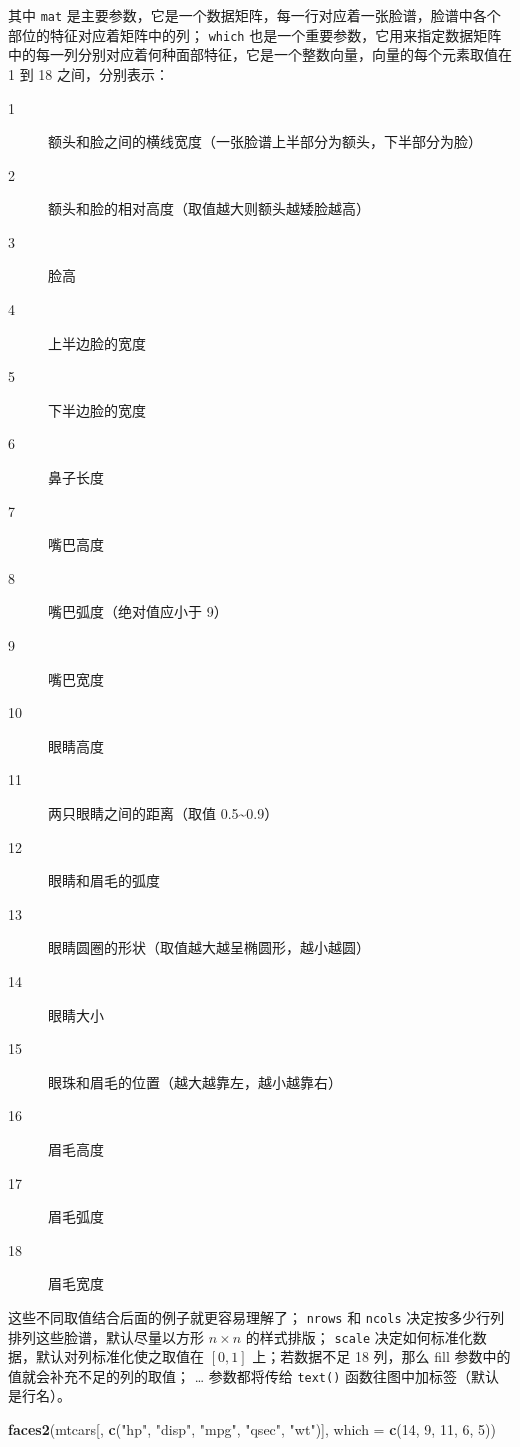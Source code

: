 \documentclass[
  b5paper,
  UTF8,twoside]{book}
\newenvironment{Shaded}{\begin{snugshade}}{\end{snugshade}}
\newcommand{\AttributeTok}[1]{\textcolor[rgb]{0.13,0.29,0.53}{#1}}
\newcommand{\DecValTok}[1]{\textcolor[rgb]{0.00,0.00,0.81}{#1}}
\newcommand{\FunctionTok}[1]{\textcolor[rgb]{0.13,0.29,0.53}{\textbf{#1}}}
\newcommand{\NormalTok}[1]{#1}
\newcommand{\StringTok}[1]{\textcolor[rgb]{0.31,0.60,0.02}{#1}}
\begin{document}
其中 \texttt{mat} 是主要参数，它是一个数据矩阵，每一行对应着一张脸谱，脸谱中各个部位的特征对应着矩阵中的列； \texttt{which} 也是一个重要参数，它用来指定数据矩阵中的每一列分别对应着何种面部特征，它是一个整数向量，向量的每个元素取值在 1 到 18 之间，分别表示：

\begin{description}
\item[1]
额头和脸之间的横线宽度（一张脸谱上半部分为额头，下半部分为脸）
\item[2]
额头和脸的相对高度（取值越大则额头越矮脸越高）
\item[3]
脸高
\item[4]
上半边脸的宽度
\item[5]
下半边脸的宽度
\item[6]
鼻子长度
\item[7]
嘴巴高度
\item[8]
嘴巴弧度（绝对值应小于 9）
\item[9]
嘴巴宽度
\item[10]
眼睛高度
\item[11]
两只眼睛之间的距离（取值 0.5\textasciitilde0.9）
\item[12]
眼睛和眉毛的弧度
\item[13]
眼睛圆圈的形状（取值越大越呈椭圆形，越小越圆）
\item[14]
眼睛大小
\item[15]
眼珠和眉毛的位置（越大越靠左，越小越靠右）
\item[16]
眉毛高度
\item[17]
眉毛弧度
\item[18]
眉毛宽度
\end{description}

这些不同取值结合后面的例子就更容易理解了； \texttt{nrows} 和 \texttt{ncols} 决定按多少行列排列这些脸谱，默认尽量以方形 \(n\times n\) 的样式排版； \texttt{scale} 决定如何标准化数据，默认对列标准化使之取值在 \([0, 1]\) 上；若数据不足 18 列，那么 fill 参数中的值就会补充不足的列的取值； \ldots{} 参数都将传给 \texttt{text()} 函数往图中加标签（默认是行名）。





\begin{Shaded}
\begin{Highlighting}[]
\FunctionTok{faces2}\NormalTok{(mtcars[, }\FunctionTok{c}\NormalTok{(}\StringTok{"hp"}\NormalTok{, }\StringTok{"disp"}\NormalTok{, }\StringTok{"mpg"}\NormalTok{, }\StringTok{"qsec"}\NormalTok{, }\StringTok{"wt"}\NormalTok{)], }\AttributeTok{which =} \FunctionTok{c}\NormalTok{(}\DecValTok{14}\NormalTok{, }\DecValTok{9}\NormalTok{, }\DecValTok{11}\NormalTok{, }\DecValTok{6}\NormalTok{, }\DecValTok{5}\NormalTok{))}
\end{Highlighting}
\end{Shaded}
\end{document}
